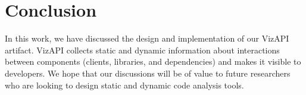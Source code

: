 \section{Conclusion}
In this work, we have discussed the design and implementation of our
VizAPI artifact. VizAPI collects static and dynamic information
about interactions between components (clients, libraries, and dependencies) and makes
it visible to developers. We hope that our discussions will be of value
to future researchers who are looking to design static and dynamic
code analysis tools.


